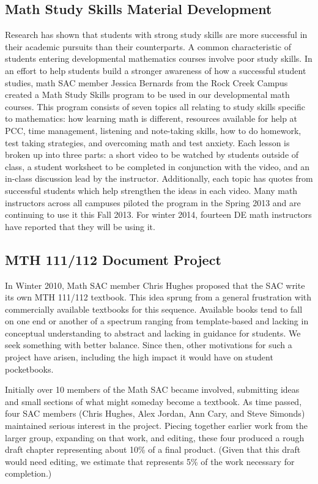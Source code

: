\subsection{Math Study Skills Material Development}
Research has shown that students with strong study skills are more successful in their academic pursuits than their counterparts.  A common characteristic of students entering developmental mathematics courses involve poor study skills.  In an effort to help students build a stronger awareness of how a successful student studies, math SAC member Jessica Bernards from the Rock Creek Campus created a Math Study Skills program to be used in our developmental math courses.  This program consists of seven topics all relating to study skills specific to mathematics: how learning math is different, resources available for help at PCC, time management, listening and note-taking skills, how to do homework, test taking strategies, and overcoming math and test anxiety.  Each lesson is broken up into three parts: a short video to be watched by students outside of class, a student worksheet to be completed in conjunction with the video, and an in-class discussion lead by the instructor. Additionally, each topic has quotes from successful students which help strengthen the ideas in each video.  Many math instructors across all campuses piloted the program in the Spring 2013 and are continuing to use it this Fall 2013. For winter 2014, fourteen DE math instructors have reported that they will be using it.
 
\subsection{MTH 111/112 Document Project}
In Winter 2010, Math SAC member Chris Hughes proposed that the SAC write its own MTH 111/112 textbook. This idea sprung from a general frustration with commercially available textbooks for this sequence.  Available books tend to fall on one end or another of a spectrum ranging from template-based and lacking in conceptual understanding to abstract and lacking in guidance for students.  We seek something with better balance.  Since then, other motivations for such a project have arisen, including the high impact it would have on student pocketbooks.

Initially over 10 members of the Math SAC became involved, submitting ideas and small sections of what might someday become a textbook.  As time passed, four SAC members (Chris Hughes, Alex Jordan, Ann Cary, and Steve Simonds) maintained serious interest in the project.  Piecing together earlier work from the larger group, expanding on that work, and editing, these four produced a rough draft chapter representing about 10\% of a final product. (Given that this draft would need editing, we estimate that represents 5\% of the work necessary for completion.)

